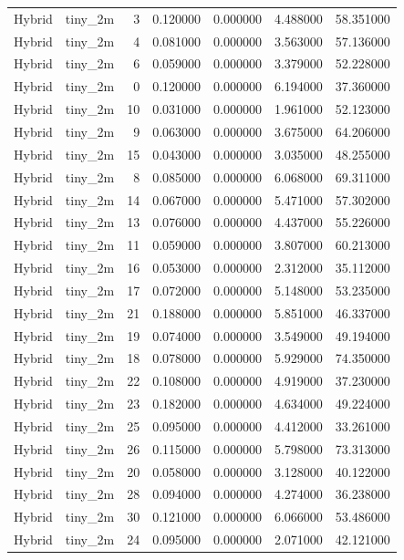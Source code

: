 \begin{tabular}{llrrrrr}
Hybrid & tiny_2m & 3 & 0.120000 & 0.000000 & 4.488000 & 58.351000 \\
Hybrid & tiny_2m & 4 & 0.081000 & 0.000000 & 3.563000 & 57.136000 \\
Hybrid & tiny_2m & 6 & 0.059000 & 0.000000 & 3.379000 & 52.228000 \\
Hybrid & tiny_2m & 0 & 0.120000 & 0.000000 & 6.194000 & 37.360000 \\
Hybrid & tiny_2m & 10 & 0.031000 & 0.000000 & 1.961000 & 52.123000 \\
Hybrid & tiny_2m & 9 & 0.063000 & 0.000000 & 3.675000 & 64.206000 \\
Hybrid & tiny_2m & 15 & 0.043000 & 0.000000 & 3.035000 & 48.255000 \\
Hybrid & tiny_2m & 8 & 0.085000 & 0.000000 & 6.068000 & 69.311000 \\
Hybrid & tiny_2m & 14 & 0.067000 & 0.000000 & 5.471000 & 57.302000 \\
Hybrid & tiny_2m & 13 & 0.076000 & 0.000000 & 4.437000 & 55.226000 \\
Hybrid & tiny_2m & 11 & 0.059000 & 0.000000 & 3.807000 & 60.213000 \\
Hybrid & tiny_2m & 16 & 0.053000 & 0.000000 & 2.312000 & 35.112000 \\
Hybrid & tiny_2m & 17 & 0.072000 & 0.000000 & 5.148000 & 53.235000 \\
Hybrid & tiny_2m & 21 & 0.188000 & 0.000000 & 5.851000 & 46.337000 \\
Hybrid & tiny_2m & 19 & 0.074000 & 0.000000 & 3.549000 & 49.194000 \\
Hybrid & tiny_2m & 18 & 0.078000 & 0.000000 & 5.929000 & 74.350000 \\
Hybrid & tiny_2m & 22 & 0.108000 & 0.000000 & 4.919000 & 37.230000 \\
Hybrid & tiny_2m & 23 & 0.182000 & 0.000000 & 4.634000 & 49.224000 \\
Hybrid & tiny_2m & 25 & 0.095000 & 0.000000 & 4.412000 & 33.261000 \\
Hybrid & tiny_2m & 26 & 0.115000 & 0.000000 & 5.798000 & 73.313000 \\
Hybrid & tiny_2m & 20 & 0.058000 & 0.000000 & 3.128000 & 40.122000 \\
Hybrid & tiny_2m & 28 & 0.094000 & 0.000000 & 4.274000 & 36.238000 \\
Hybrid & tiny_2m & 30 & 0.121000 & 0.000000 & 6.066000 & 53.486000 \\
Hybrid & tiny_2m & 24 & 0.095000 & 0.000000 & 2.071000 & 42.121000 \\

\end{tabular}
